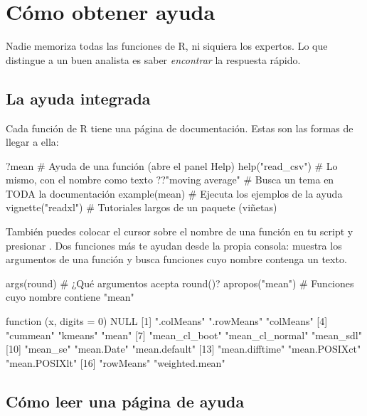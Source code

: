\section{Cómo obtener ayuda}
\label{sec:m1-ayuda}

Nadie memoriza todas las funciones de R, ni siquiera los expertos. Lo que
distingue a un buen analista es saber \emph{encontrar} la respuesta rápido.

\subsection{La ayuda integrada}

Cada función de R tiene una página de documentación. Estas son las formas
de llegar a ella:

\begin{rnoejecutar}
?mean                    # Ayuda de una función (abre el panel Help)
help("read_csv")         # Lo mismo, con el nombre como texto
??"moving average"       # Busca un tema en TODA la documentación
example(mean)            # Ejecuta los ejemplos de la ayuda
vignette("readxl")       # Tutoriales largos de un paquete (viñetas)
\end{rnoejecutar}

También puedes colocar el cursor sobre el nombre de una función en tu
script y presionar . Dos funciones más te ayudan desde la propia
consola:  muestra los argumentos de una función y
 busca funciones cuyo nombre contenga un texto.

\begin{rcode}
args(round)            # ¿Qué argumentos acepta round()?
apropos("mean")        # Funciones cuyo nombre contiene "mean"
\end{rcode}
\begin{rsalida}
function (x, digits = 0) 
NULL
 [1] ".colMeans"      ".rowMeans"      "colMeans"      
 [4] "cummean"        "kmeans"         "mean"          
 [7] "mean_cl_boot"   "mean_cl_normal" "mean_sdl"      
[10] "mean_se"        "mean.Date"      "mean.default"  
[13] "mean.difftime"  "mean.POSIXct"   "mean.POSIXlt"  
[16] "rowMeans"       "weighted.mean" 
\end{rsalida}

\subsection{Cómo leer una página de ayuda}

